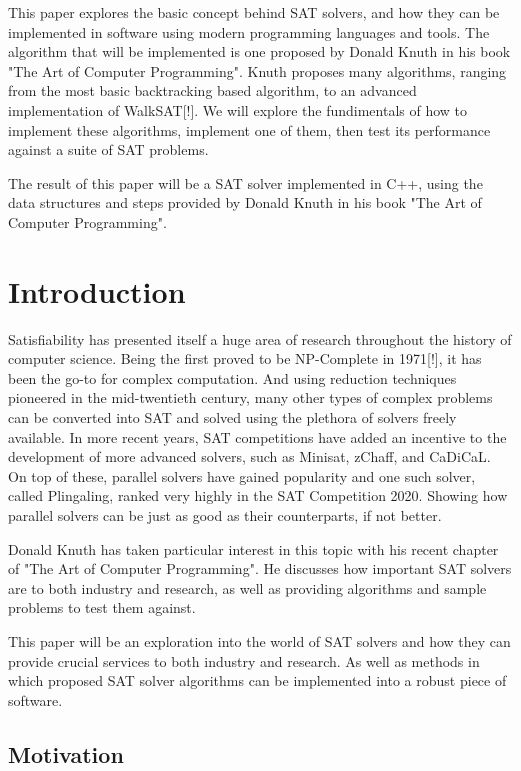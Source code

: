 \documentclass{article}
\begin{document}
This paper explores the basic concept behind SAT solvers, and how they can be implemented in
software using modern programming languages and tools. The algorithm that will be
implemented is one proposed by Donald Knuth in his book "The Art of Computer Programming". Knuth proposes
many algorithms, ranging from the most basic backtracking based algorithm, to an advanced
implementation of WalkSAT[!]. We will explore the fundimentals of how to implement these algorithms,
implement one of them, then test its performance against a suite of SAT problems.

The result of this paper will be a SAT solver implemented in C++, using the data structures and
steps provided by Donald Knuth in his book "The Art of Computer Programming".

\newpage
\tableofcontents

\newpage
\section{Introduction}
Satisfiability has presented itself a huge area of research throughout the history of computer
science. Being the first proved to be NP-Complete in 1971[!], it has been the go-to for complex
computation. And using reduction techniques pioneered in the mid-twentieth century, many other types
of complex problems can be converted into SAT and solved using the plethora of solvers freely
available. In more recent years, SAT competitions have added an incentive to the development of more
advanced solvers, such as Minisat, zChaff, and CaDiCaL. On top of these, parallel solvers have
gained popularity and one such solver, called Plingaling, ranked very highly in the SAT Competition
2020. Showing how parallel solvers can be just as good as their counterparts, if not better.

Donald Knuth has taken particular interest in this topic with his recent chapter of "The Art of Computer Programming". He discusses how important SAT solvers are to both industry and research, as well as providing algorithms and sample problems to test them against.

This paper will be an exploration into the world of SAT solvers and how they can provide crucial services to both industry and research. As well as methods in which proposed SAT solver algorithms can be implemented into a robust piece of software.

\subsection{Motivation}
\end{document}
